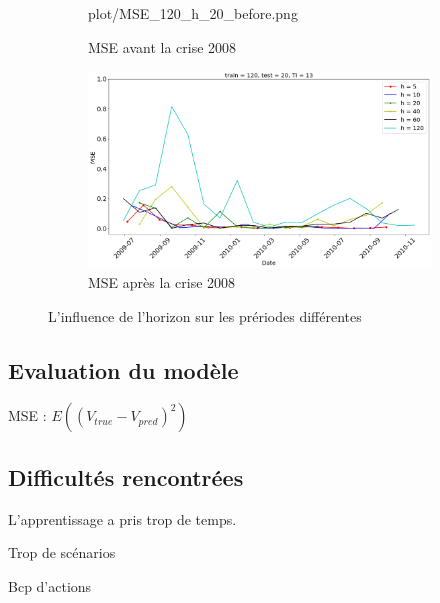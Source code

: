 \begin{figure}[H]
\begin{subfigure}{.5\textwidth}
	{plot/MSE_120_h_20_before.png}
	\caption{MSE avant la crise 2008}
	\label{fig:Horizon_before}
	\end{subfigure}%
	\begin{subfigure}{.5\textwidth}
	\centering
	\includegraphics[width=.9\linewidth, scale=0.2]
	{plot/MSE_120_h_20_after.png}
	\caption{MSE après la crise 2008}
	\label{fig:Horizon_after}
	\end{subfigure}
\caption{L'influence de l'horizon sur les prériodes différentes}
\label{fig:ME_Trainingset}
\end{figure}


\subsection{Evaluation du modèle}

MSE : $ E((V_{true} - V_{pred})^2) $

\subsection{Difficultés rencontrées}


L’apprentissage a pris trop de temps.

Trop de scénarios

Bcp d’actions
